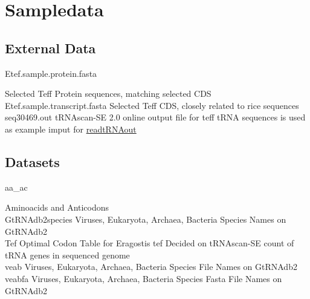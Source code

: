 \section{Sampledata}

\subsection{External Data}
\hypertarget{data:RNA}{Etef.sample.protein.fasta} \quad Selected Teff Protein sequences, matching selected CDS \\
\hypertarget{data:AA}{Etef.sample.transcript.fasta} \quad  Selected Teff CDS, closely related to rice sequences \\
\hypertarget{data:tRNAlist}{seq30469.out} \quad tRNAscan-SE 2.0 online output file for teff tRNA sequences is used as example imput for \hyperlink{function:rtRNAo}{readtRNAout} \\

\subsection{Datasets}
\hypertarget{data:aaac}{aa\_ac}	\quad Aminoacids and Anticodons \\
\hypertarget{data:species}{GtRNAdb2species}	\quad Viruses, Eukaryota, Archaea, Bacteria Species Names on GtRNAdb2 \\
\hypertarget{data:Tef}{Tef}	\quad Optimal Codon Table for Eragostis tef Decided on tRNAscan-SE count of tRNA genes in sequenced genome \\
\hypertarget{data:veab}{veab}		\quad Viruses, Eukaryota, Archaea, Bacteria Species File Names on GtRNAdb2 \\
\hypertarget{data:veabfa}{veabfa}	\quad Viruses, Eukaryota, Archaea, Bacteria Species Fasta File Names on GtRNAdb2 \\
